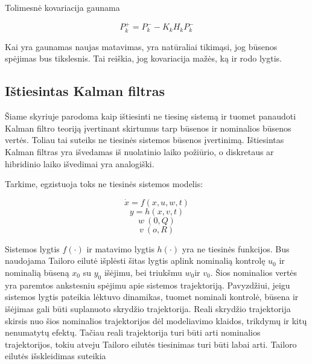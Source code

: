 \documentclass[12pt, a4paper, lithuanian]{article}
\begin{document}
        Tolimesnė kovariacija gaunama

        \begin{equation}
            P_k^+ = P_k^- - K_kH_kP_k^-
        \end{equation}

        Kai yra gaunamas naujas matavimas, yra natūraliai tikimąsi, jog būsenos spėjimas bus tikslesnis.
        Tai reiškia, jog kovariacija mažės, ką ir rodo lygtis.

        \subsection{Ištiesintas Kalman filtras}

        Šiame skyriuje parodoma kaip ištiesinti ne tiesinę sistemą ir tuomet panaudoti Kalman filtro teoriją įvertinant skirtumus tarp būsenos ir nominalios būsenos vertės.
        Toliau tai suteiks ne tiesinės sistemos būsenos įvertinimą.
        Ištiesintas Kalman filtras yra išvedamas iš nuolatinio laiko požiūrio, o diskretaus ar hibridinio laiko išvedimai yra analogiški.

        Tarkime, egzistuoja toks ne tiesinės sistemos modelis:

        \begin{equation}
            \dot{x} = f(x,u,w,t)
        \end{equation}
        \begin{equation}
            y = h(x,v,t)
        \end{equation}
        \begin{equation}
            w ~ (0,Q)
        \end{equation}
        \begin{equation}
            v ~ (o,R)
        \end{equation}

        Sistemos lygtis $f(\cdot)$ ir matavimo lygtis $h(\cdot)$ yra ne tiesinės funkcijos.
        Bus naudojama Tailoro eilutė išplėsti šitas lygtis aplink nominalią kontrolę $u_0$ ir nominalią būseną $x_0$ su $y_0$ išėjimu, bei triukšmu $w_0$ir $v_0$.
        Šios nominalios vertės yra paremtos ankstesniu spėjimu apie sistemos trajektoriją.
        Pavyzdžiui, jeigu sistemos lygtis pateikia lėktuvo dinamikas, tuomet nominali kontrolė, būsena ir išėjimas gali būti suplanuoto skrydžio trajektorija.
        Reali skrydžio trajektorija skirsis nuo šios nominalios trajektorijos dėl modeliavimo klaidos, trikdymų ir kitų nenumatytų efektų.
        Tačiau reali trajektorija turi būti arti nominalios trajektorijos, tokiu atveju Tailoro eilutės tiesinimas turi būti labai arti.
        Tailoro eilutės išskleidimas suteikia
\end{document}
